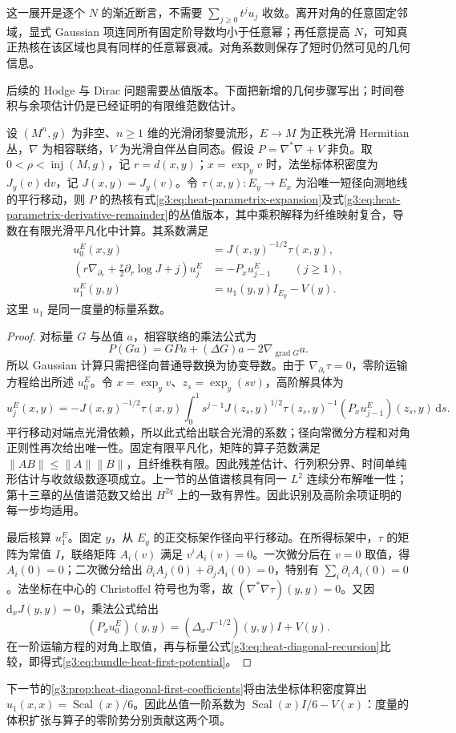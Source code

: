 这一展开是逐个 \(N\) 的渐近断言，不需要 \(\sum_{j\ge0}t^ju_j\) 收敛。离开对角的任意固定邻域，显式 Gaussian 项连同所有固定阶导数均小于任意幂；再任意提高 \(N\)，可知真正热核在该区域也具有同样的任意幂衰减。对角系数则保存了短时仍然可见的几何信息。

\ProseParagraphBreak

后续的 Hodge 与 Dirac 问题需要丛值版本。下面把新增的几何步骤写出；时间卷积与余项估计仍是已经证明的有限维范数估计。

\begin{proposition}\label{g3:prop:laplace-type-heat-parametrix}
	设 \((M^n,g)\) 为非空、\(n\ge1\) 维的光滑闭黎曼流形，\(E\to M\) 为正秩光滑 Hermitian 丛，\(\nabla\) 为相容联络，\(V\) 为光滑自伴丛自同态。假设 \(P=\nabla^*\nabla+V\) 非负。取 \(0<\rho<\operatorname{inj}(M,g)\)，记 \(r=d(x,y)\)；\(x=\exp_yv\) 时，法坐标体积密度为 \(J_y(v)\,\mathrm dv\)，记 \(J(x,y)=J_y(v)\)。令 \(\tau(x,y):E_y\to E_x\) 为沿唯一短径向测地线的平行移动，则 \(P\) 的热核有式\eqref{g3:eq:heat-parametrix-expansion}及式\eqref{g3:eq:heat-parametrix-derivative-remainder}的丛值版本，其中乘积解释为纤维映射复合，导数在有限光滑平凡化中计算。其系数满足
	\begin{align}
		u_0^E(x,y)&=J(x,y)^{-1/2}\tau(x,y),\label{g3:eq:bundle-heat-leading-coefficient}\\
		\left(r\nabla_{\partial_r}+\tfrac r2\partial_r\log J+j\right)u_j^E
		&=-P_xu_{j-1}^E\qquad(j\ge1),\label{g3:eq:bundle-heat-transport}\\
		u_1^E(y,y)&=u_1(y,y)I_{E_y}-V(y).\label{g3:eq:bundle-heat-first-potential}
	\end{align}
	这里 \(u_1\) 是同一度量的标量系数。
\end{proposition}
\begin{proof}
	对标量 \(G\) 与丛值 \(a\)，相容联络的乘法公式为
	\[
		P(Ga)=GPa+(\Delta G)a-2\nabla_{\operatorname{grad}G}a.
	\]
	所以 Gaussian 计算只需把径向普通导数换为协变导数。由于 \(\nabla_{\partial_r}\tau=0\)，零阶运输方程给出所述 \(u_0^E\)。令 \(x=\exp_yv\)、\(z_s=\exp_y(sv)\)，高阶解具体为
	\[
		u_j^E(x,y)=-J(x,y)^{-1/2}\tau(x,y)
		\int_0^1s^{j-1}J(z_s,y)^{1/2}\tau(z_s,y)^{-1}
		(P_xu_{j-1}^E)(z_s,y)\,\mathrm ds.
	\]
	平行移动对端点光滑依赖，所以此式给出联合光滑的系数；径向常微分方程和对角正则性再次给出唯一性。固定有限平凡化，矩阵的算子范数满足 \(\|AB\|\le\|A\|\|B\|\)，且纤维秩有限。因此残差估计、行列积分界、时间单纯形估计与收敛级数逐项成立。上一节的丛值谱核具有同一 \(L^2\) 连续分布解唯一性；第十三章的丛值谱范数又给出 \(H^{2q}\) 上的一致有界性。因此识别及高阶余项证明的每一步均适用。

	最后核算 \(u_1^E\)。固定 \(y\)，从 \(E_y\) 的正交标架作径向平行移动。在所得标架中，\(\tau\) 的矩阵为常值 \(I\)，联络矩阵 \(A_i(v)\) 满足 \(v^iA_i(v)=0\)。一次微分后在 \(v=0\) 取值，得 \(A_i(0)=0\)；二次微分给出 \(\partial_iA_j(0)+\partial_jA_i(0)=0\)，特别有 \(\sum_i\partial_iA_i(0)=0\)。法坐标在中心的 Christoffel 符号也为零，故 \((\nabla^*\nabla\tau)(y,y)=0\)。又因 \(\mathrm d_xJ(y,y)=0\)，乘法公式给出
	\[
		(P_xu_0^E)(y,y)=(\Delta_xJ^{-1/2})(y,y)I+V(y).
	\]
	在一阶运输方程的对角上取值，再与标量公式\eqref{g3:eq:heat-diagonal-recursion}比较，即得式\eqref{g3:eq:bundle-heat-first-potential}。
\end{proof}

下一节的\cref{g3:prop:heat-diagonal-first-coefficients}将由法坐标体积密度算出 \(u_1(x,x)=\operatorname{Scal}(x)/6\)。因此丛值一阶系数为 \(\operatorname{Scal}(x)I/6-V(x)\)：度量的体积扩张与算子的零阶势分别贡献这两个项。

